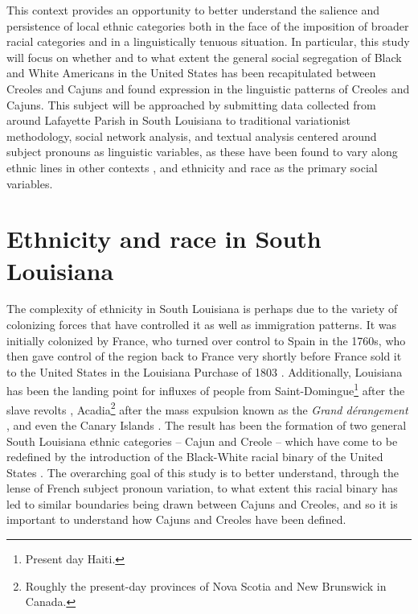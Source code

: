 \documentclass{article}\usepackage[]{graphicx}\usepackage[]{xcolor}
\newcommand{\foreign}[1]{\textit{#1}}
\begin{document}
  This context provides an opportunity to better understand the salience and persistence of local ethnic categories both in the face of the imposition of broader racial categories and in a linguistically tenuous situation.
  In particular, this study will focus on whether and to what extent the general social segregation of Black and White Americans in the United States \parencite{smith_social_2014} has been recapitulated between Creoles and Cajuns and found expression in the linguistic patterns of Creoles and Cajuns.
  This subject will be approached by submitting data collected from around Lafayette Parish in South Louisiana to traditional variationist methodology, social network analysis, and textual analysis centered around subject pronouns as linguistic variables, as these have been found to vary along ethnic lines in other contexts \parencite{dajko_ethnic_2009, rottet_language_1995}, and ethnicity and race as the primary social variables.

  \section{Ethnicity and race in South Louisiana}
    \label{sec:ethnicity_race}
    The complexity of ethnicity in South Louisiana is perhaps due to the variety of colonizing forces that have controlled it as well as immigration patterns.
    It was initially colonized by France, who turned over control to Spain in the 1760s, who then gave control of the region back to France very shortly before France sold it to the United States in the Louisiana Purchase of 1803 \parencite{fortier_french_1884, johnson_louisiana_1976, klingler_if_2003}.
    Additionally, Louisiana has been the landing point for influxes of people from Saint-Domingue\footnote{
      Present day Haiti.
    } after the slave revolts \parencite[Debien \& Le Gardeur, 1981, as cited in][]{klingler_if_2003}, Acadia\footnote{
      Roughly the present-day provinces of Nova Scotia and New Brunswick in Canada.
    } after the mass expulsion known as the \foreign{Grand dérangement} \parencite{fortier_french_1884, klingler_if_2003, neumann_creole_1985}, and even the Canary Islands \parencite{klingler_if_2003}.
    The result has been the formation of two general South Louisiana ethnic categories -- Cajun and Creole -- which have come to be redefined by the introduction of the Black-White racial binary of the United States \parencite{dajko_sociolinguistics_2012}.
    The overarching goal of this study is to better understand, through the lense of French subject pronoun variation, to what extent this racial binary has led to similar boundaries being drawn between Cajuns and Creoles, and so it is important to understand how Cajuns and Creoles have been defined.
\end{document}
